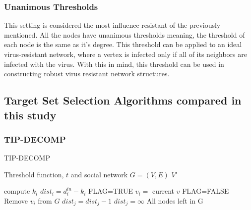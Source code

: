 \subsubsection{Unanimous Thresholds}
This setting is considered the most influence-resistant of the previously mentioned.\cite{chen} All the nodes have unanimous thresholds meaning, the threshold of each node is the same as it's degree. This threshold can be applied to an ideal virus-resistant network, where a vertex is infected only if all of its neighbors are infected with the virus. With this in mind, this threshold can be used in constructing robust virus resistant network structures.\cite{chen}
\subsection{Target Set Selection Algorithms compared in this study}

\subsubsection{TIP-DECOMP}
\begin{algorithm}
	\caption{TIP-DECOMP}
	\begin{algorithmic}[1]
		\Require Threshold function, $t$ and social network $G=(V,E)$
		\Ensure $V'$
		
			\State compute $k_{i}$ 
		\EndFor
			\State $dist_{i}=d_{i}^{in}-k_{i} $
		\EndFor
		\State FLAG=TRUE 
					\State $v_{i}=$ current $v$
				\EndIf
			\EndFor
				\State FLAG=FALSE 
			\Else
			\State Remove $v_{i}$ from $G$ 
						\State $dist_{j}=dist_{j}-1$
					\Else
						\State$dist_{j}=\infty$  
					\EndIf
				\EndFor
			\EndIf
		\EndWhile
		\State \Return All nodes left in G 
	\end{algorithmic}
\end{algorithm}

